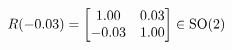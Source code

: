 \documentclass[preview]{standalone}
\begin{document}
\begin{align*}
\special{dvisvgm:raw <g id='unique000'>}R(-0.03) = \begin{bmatrix} 1.00 & 0.03 \\ -0.03 & 1.00 \end{bmatrix} \in \text{SO}(2)\special{dvisvgm:raw </g>}
\end{align*}
\end{document}
